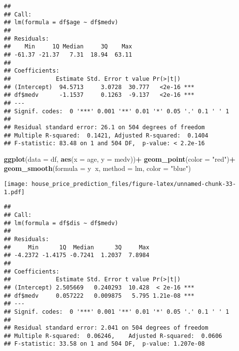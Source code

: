\documentclass[
]{article}
\newenvironment{Shaded}{\begin{snugshade}}{\end{snugshade}}
\newcommand{\DataTypeTok}[1]{\textcolor[rgb]{0.13,0.29,0.53}{#1}}
\newcommand{\KeywordTok}[1]{\textcolor[rgb]{0.13,0.29,0.53}{\textbf{#1}}}
\newcommand{\NormalTok}[1]{#1}
\newcommand{\OperatorTok}[1]{\textcolor[rgb]{0.81,0.36,0.00}{\textbf{#1}}}
\newcommand{\StringTok}[1]{\textcolor[rgb]{0.31,0.60,0.02}{#1}}
\begin{document}
\begin{verbatim}
## 
## Call:
## lm(formula = df$age ~ df$medv)
## 
## Residuals:
##    Min     1Q Median     3Q    Max 
## -61.37 -21.37   7.31  18.94  63.11 
## 
## Coefficients:
##             Estimate Std. Error t value Pr(>|t|)    
## (Intercept)  94.5713     3.0728  30.777   <2e-16 ***
## df$medv      -1.1537     0.1263  -9.137   <2e-16 ***
## ---
## Signif. codes:  0 '***' 0.001 '**' 0.01 '*' 0.05 '.' 0.1 ' ' 1
## 
## Residual standard error: 26.1 on 504 degrees of freedom
## Multiple R-squared:  0.1421, Adjusted R-squared:  0.1404 
## F-statistic: 83.48 on 1 and 504 DF,  p-value: < 2.2e-16
\end{verbatim}

\begin{Shaded}
\begin{Highlighting}[]
\KeywordTok{ggplot}\NormalTok{(}\DataTypeTok{data =}\NormalTok{ df, }\KeywordTok{aes}\NormalTok{(}\DataTypeTok{x =}\NormalTok{ age, }\DataTypeTok{y =}\NormalTok{ medv))}\OperatorTok{+}
\StringTok{  }\KeywordTok{geom_point}\NormalTok{(}\DataTypeTok{color =} \StringTok{"red"}\NormalTok{)}\OperatorTok{+}
\StringTok{  }\KeywordTok{geom_smooth}\NormalTok{(}\DataTypeTok{formula =}\NormalTok{ y}\OperatorTok{~}\NormalTok{x, }\DataTypeTok{method =}\NormalTok{ lm, }\DataTypeTok{color =} \StringTok{"blue"}\NormalTok{)}
\end{Highlighting}
\end{Shaded}

\texttt{[image: house\_price\_prediction\_files/figure-latex/unnamed-chunk-33-1.pdf]}

\begin{Shaded}
\end{Shaded}

\begin{verbatim}
## 
## Call:
## lm(formula = df$dis ~ df$medv)
## 
## Residuals:
##     Min      1Q  Median      3Q     Max 
## -4.2372 -1.4175 -0.7241  1.2037  7.8984 
## 
## Coefficients:
##             Estimate Std. Error t value Pr(>|t|)    
## (Intercept) 2.505669   0.240293  10.428  < 2e-16 ***
## df$medv     0.057222   0.009875   5.795 1.21e-08 ***
## ---
## Signif. codes:  0 '***' 0.001 '**' 0.01 '*' 0.05 '.' 0.1 ' ' 1
## 
## Residual standard error: 2.041 on 504 degrees of freedom
## Multiple R-squared:  0.06246,    Adjusted R-squared:  0.0606 
## F-statistic: 33.58 on 1 and 504 DF,  p-value: 1.207e-08
\end{verbatim}
\end{document}

